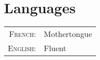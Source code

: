 \documentclass[a4paper,10pt]{article}
\begin{document}
\section{Languages}
\begin{tabular}{rl}
 \textsc{French:}&Mothertongue\\
 \textsc{English:}&Fluent\\
\end{tabular}
\end{document}
